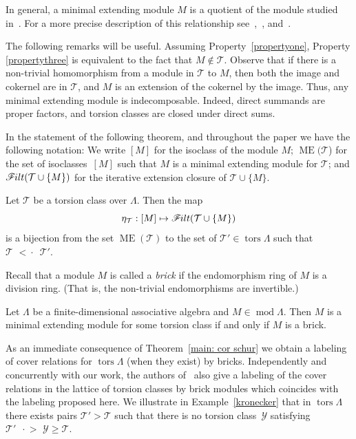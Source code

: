 \documentclass[ALCO,ThmDefs,Unicode,epreuves]{cedram}
\DeclareMathOperator{\tors}{tors}
\DeclareMathOperator{\ME}{ME}%
\DeclareMathOperator{\module}{mod}
\newcommand{\calT}{\mathcal{T}}
\newcommand{\calY}{\mathcal{Y}}
\newcommand{\filt}{\mathscr{F}\Mk ilt}
\newcommand{\covers}{{\,\,\,\cdot\!\!\!\! >\,\,}}
\newcommand{\covered}{{\,\,<\!\!\!\!\cdot\,\,\,}}
\renewcommand{\1}{\hat{1}}
\newcommand{\0}{\hat{0}}
\newcommand{\newword}[1]{\emph{#1}}
\newcommand*{\Mk}{\mkern -2mu}
\begin{document}
In general, a minimal extending module $M$ is a quotient of the module studied in~\cite{AIR}.
For a more precise description of this relationship see~\cite[Proposition~1.9]{Asai},~\cite[Theorem~4.1]{DIJ}, and~\cite[Theorem~3.11]{DIRRT}.

The following remarks will be useful. 
Assuming Property~\ref{propertyone}, Property
\ref{propertythree} is equivalent to the fact that $M\notin \calT$. 
Observe that if there is a non-trivial homomorphism from a module in
$\calT$ to $M$, then both the image and cokernel are in $\calT$, and
$M$ is an extension of the cokernel by the image.
Thus, any minimal extending module is indecomposable. 
Indeed, direct summands are proper factors, and torsion classes are closed under direct sums. 

In the statement of the following theorem, and throughout the paper we have the following notation:
We write $[M]$ for the isoclass of the module $M$; $\ME(\calT$) for the set of isoclasses~$[M]$ such that $M$ is a minimal extending module for $\calT$; and $\filt(\calT \cup \{M\})$ for the iterative extension closure of $\calT \cup \{M\}$.

\begin{theorem}\label{main: covers}
Let $\calT$ be a torsion class over $\Lambda$.
Then the map $$\eta_\calT: [M]\mapsto \filt(\calT\cup \{M\})$$ is a bijection from the set $\ME(\calT)$ to the set of $\calT' \in \tors \Lambda$ such that $\calT \covered \calT'$.
\end{theorem}

Recall that a module $M$ is called a \newword{brick} if the
endomorphism ring of $M$ is a division ring. (That is, the non-trivial
endomorphisms are invertible.)

\begin{theorem}\label{main: cor schur}
Let $\Lambda$ be a finite-dimensional associative algebra and $M\in\module\Lambda$.
Then $M$ is a minimal extending module for some torsion class if and
only if $M$ is a brick.
\end{theorem}

As an immediate consequence of Theorem~\ref{main: cor schur} we
obtain a labeling of cover relations for $\tors
\Lambda$ (when they exist) by bricks. 
Independently and concurrently with our work, the authors of~\cite{DIRRT} also give a labeling of the cover relations in the lattice of torsion classes by brick modules which coincides with the labeling proposed here.
We illustrate in Example~\ref{kronecker} that in $\tors
\Lambda$ there exists pairs $\calT'> \calT$ such that there is no
torsion class~$\calY$ satisfying $\calT' \covers \calY \ge \calT$. 
\end{document}
